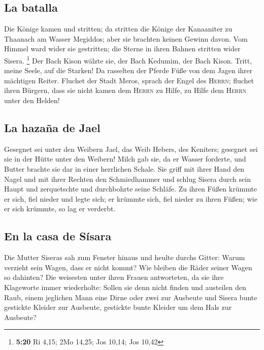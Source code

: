 \hypertarget{la-batalla}{%
\subsection{La batalla}\label{la-batalla}}

 Die Könige kamen und stritten; da stritten die Könige
der Kanaaniter zu Thaanach am Wasser Megiddos; aber sie brachten keinen
Gewinn davon.  Vom Himmel ward wider sie gestritten; die
Sterne in ihren Bahnen stritten wider Sisera. \footnote{\textbf{5:20} Ri
  4,15; 2Mo 14,25; Jos 10,14; Jos 10,42}  Der Bach Kison
wälzte sie, der Bach Kedumim, der Bach Kison. Tritt, meine Seele, auf
die Starken!  Da rasselten der Pferde Füße von dem Jagen
ihrer mächtigen Reiter.  Fluchet der Stadt Meros, sprach
der Engel des \textsc{Herrn}; fluchet ihren Bürgern, dass sie nicht
kamen dem \textsc{Herrn} zu Hilfe, zu Hilfe dem \textsc{Herrn} unter den
Helden!

\hypertarget{la-hazauxf1a-de-jael}{%
\subsection{La hazaña de Jael}\label{la-hazauxf1a-de-jael}}

 Gesegnet sei unter den Weibern Jael, das Weib Hebers,
des Keniters; gesegnet sei sie in der Hütte unter den Weibern!
 Milch gab sie, da er Wasser forderte, und Butter brachte
sie dar in einer herrlichen Schale.  Sie griff mit ihrer
Hand den Nagel und mit ihrer Rechten den Schmiedhammer und schlug Sisera
durch sein Haupt und zerquetschte und durchbohrte seine Schläfe.
 Zu ihren Füßen krümmte er sich, fiel nieder und legte
sich; er krümmte sich, fiel nieder zu ihren Füßen; wie er sich krümmte,
so lag er verderbt.

\hypertarget{en-la-casa-de-suxedsara}{%
\subsection{En la casa de Sísara}\label{en-la-casa-de-suxedsara}}

 Die Mutter Siseras sah zum Fenster hinaus und heulte
durchs Gitter: Warum verzieht sein Wagen, dass er nicht kommt? Wie
bleiben die Räder seiner Wagen so dahinten?  Die
weisesten unter ihren Frauen antworteten, da sie ihre Klageworte immer
wiederholte:  Sollen sie denn nicht finden und austeilen
den Raub, einem jeglichen Mann eine Dirne oder zwei zur Ausbeute und
Sisera bunte gestickte Kleider zur Ausbeute, gestickte bunte Kleider um
dem Hals zur Ausbeute?

